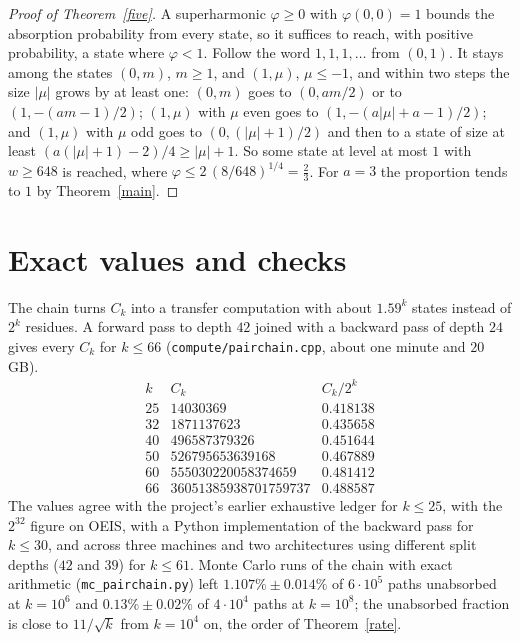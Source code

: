 \documentclass[11pt]{article}
\theoremstyle{remark}
\begin{document}
\begin{proof}[Proof of Theorem~\ref{five}]
A superharmonic $\varphi\ge0$ with $\varphi(0,0)=1$ bounds the absorption probability from every
state, so it suffices to reach, with positive probability, a state where $\varphi<1$. Follow the
word $1,1,1,\dots$ from $(0,1)$. It stays among the states $(0,m)$, $m\ge1$, and $(1,\mu)$,
$\mu\le-1$, and within two steps the size $|\mu|$ grows by at least one: $(0,m)$ goes to
$(0,am/2)$ or to $(1,-(am-1)/2)$; $(1,\mu)$ with $\mu$ even goes to $(1,-(a|\mu|+a-1)/2)$; and
$(1,\mu)$ with $\mu$ odd goes to $(0,(|\mu|+1)/2)$ and then to a state of size at least
$(a(|\mu|+1)-2)/4\ge|\mu|+1$. So some state at level at most $1$ with $w\ge648$ is reached, where
$\varphi\le2\,(8/648)^{1/4}=\tfrac23$. For $a=3$ the proportion tends to $1$ by Theorem~\ref{main}.
\end{proof}

\section{Exact values and checks}\label{sec:checks}
The chain turns $C_k$ into a transfer computation with about $1.59^k$ states instead of $2^k$
residues. A forward pass to depth $42$ joined with a backward pass of depth $24$ gives every $C_k$
for $k\le66$ (\texttt{compute/pairchain.cpp}, about one minute and $20$\,GB).
\[
\begin{array}{rrl}
k & C_k & C_k/2^k\\\hline
25 & 14030369 & 0.418138\\
32 & 1871137623 & 0.435658\\
40 & 496587379326 & 0.451644\\
50 & 526795653639168 & 0.467889\\
60 & 555030220058374659 & 0.481412\\
66 & 36051385938701759737 & 0.488587
\end{array}
\]
The values agree with the project's earlier exhaustive ledger for $k\le25$, with the $2^{32}$
figure on OEIS, with a Python implementation of the backward pass for $k\le30$, and across three
machines and two architectures using different split depths ($42$ and $39$) for $k\le61$. Monte
Carlo runs of the chain with exact arithmetic (\texttt{mc\_pairchain.py}) left $1.107\%\pm0.014\%$
of $6\cdot10^5$ paths unabsorbed at $k=10^6$ and $0.13\%\pm0.02\%$ of $4\cdot10^4$ paths at $k=10^8$;
the unabsorbed fraction is close to $11/\sqrt k$ from $k=10^4$ on, the order of
Theorem~\ref{rate}.
\end{document}
